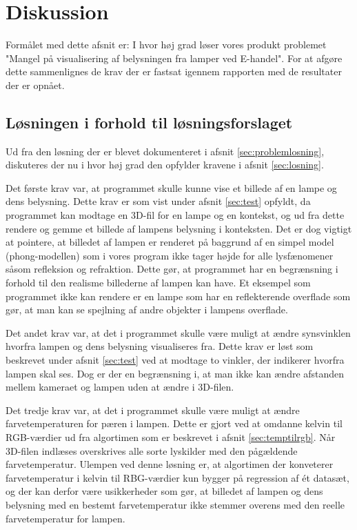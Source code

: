 \section{Diskussion}


Formålet med dette afsnit er: I hvor høj grad løser vores produkt problemet "Mangel på visualisering af belysningen fra lamper ved E-handel". For at afgøre dette sammenlignes de krav der er fastsat igennem rapporten med de resultater der er opnået. 

\subsection{Løsningen i forhold til løsningsforslaget}

Ud fra den løsning der er blevet dokumenteret i afsnit \ref{sec:problemlosning}, diskuteres der nu i hvor høj grad den opfylder kravene i afsnit \ref{sec:losning}. 

Det første krav var, at programmet skulle kunne vise et billede af en lampe og dens belysning. Dette krav er som vist under afsnit \ref{sec:test} opfyldt, da programmet kan modtage en 3D-fil for en lampe og en kontekst, og ud fra dette rendere og gemme et billede af lampens belysning i konteksten. Det er dog vigtigt at pointere, at billedet af lampen er renderet på baggrund af en simpel model (phong-modellen) som i vores program ikke tager højde for alle lysfænomener såsom refleksion og refraktion. Dette gør, at programmet har en begrænsning i forhold til den realisme billederne af lampen kan have. Et eksempel som programmet ikke kan rendere er en lampe som har en reflekterende overflade som gør, at man kan se spejlning af andre objekter i lampens overflade.  

Det andet krav var, at det i programmet skulle være muligt at ændre synsvinklen hvorfra lampen og dens belysning visualiseres fra. Dette krav er løst som beskrevet under afsnit \ref{sec:test} ved at modtage to vinkler, der indikerer hvorfra lampen skal ses. Dog er der en begrænsning i, at man ikke kan ændre afstanden mellem kameraet og lampen uden at ændre i 3D-filen. 

Det tredje krav var, at det i programmet skulle være muligt at ændre farvetemperaturen for pæren i lampen. Dette er gjort ved at omdanne kelvin til RGB-værdier ud fra algortimen som er beskrevet i afsnit \ref{sec:temptilrgb}. Når 3D-filen indlæses overskrives alle sorte lyskilder med den pågældende farvetemperatur. Ulempen ved denne løsning er, at algortimen der konveterer farvetemperatur i kelvin til RBG-værdier kun bygger på regression af ét datasæt, og der kan derfor være usikkerheder som gør, at billedet af lampen og dens belysning med en bestemt farvetemperatur ikke stemmer overens med den reelle farvetemperatur for lampen. 

